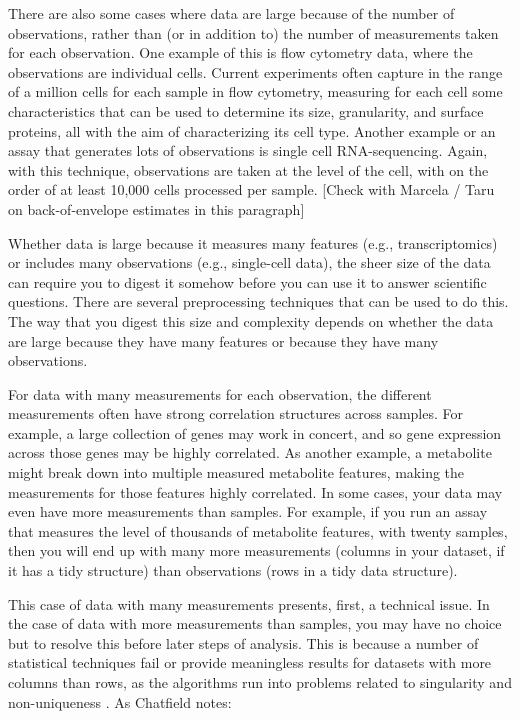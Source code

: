 \documentclass[]{tufte-book}
\begin{document}
There are also some cases where data are large because of the number of
observations, rather than (or in addition to) the number of measurements taken
for each observation. One example of this is flow cytometry data, where the
observations are individual cells. Current experiments often capture in the
range of a million cells for each sample in flow cytometry, measuring for each
cell some characteristics that can be used to determine its size, granularity,
and surface proteins, all with the aim of characterizing its cell type. Another
example or an assay that generates lots of observations is single cell
RNA-sequencing. Again, with this technique, observations are taken at the level
of the cell, with on the order of at least 10,000 cells processed per sample.
{[}Check with Marcela / Taru on back-of-envelope estimates in this paragraph{]}

Whether data is large because it measures many features (e.g., transcriptomics)
or includes many observations (e.g., single-cell data), the sheer size of the
data can require you to digest it somehow before you can use it to answer
scientific questions. There are several preprocessing techniques that can be
used to do this. The way that you digest this size and complexity depends on
whether the data are large because they have many features or because they have
many observations.

For data with many measurements for each observation, the different measurements
often have strong correlation structures across samples. For example, a large
collection of genes may work in concert, and so gene expression across those
genes may be highly correlated. As another example, a metabolite might break
down into multiple measured metabolite features, making the measurements for
those features highly correlated. In some cases, your data may even have more
measurements than samples. For example, if you run an assay that measures the
level of thousands of metabolite features, with twenty samples, then you will
end up with many more measurements (columns in your dataset, if it has a tidy
structure) than observations (rows in a tidy data structure).

This case of data with many measurements presents, first, a technical issue. In
the case of data with more measurements than samples, you may have no choice but
to resolve this before later steps of analysis. This is because a number of
statistical techniques fail or provide meaningless results for datasets with
more columns than rows, as the algorithms run into problems
related to singularity and non-uniqueness \citep{chatfield1995problem}. As Chatfield
notes:
\end{document}
